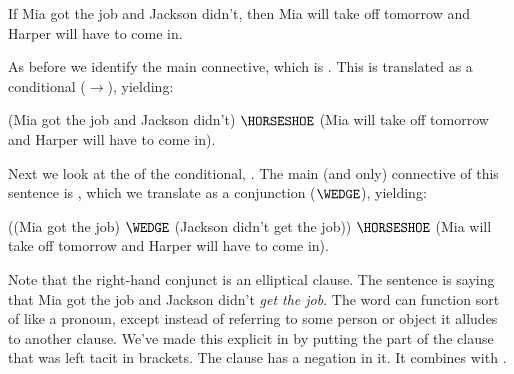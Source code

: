 \begin{majorILnc}{}
	\begin{menumerate}
		\item\label{GSLTransSentenceI} If Mia got the job and Jackson didn't, then Mia will take off tomorrow and Harper will have to come in.
	\end{menumerate}
	As before we identify the main connective, which is . 
	This is translated as a conditional ($\rightarrow$), yielding: 
	\begin{menumerate}
		\item\label{GSLTransSentenceJ} (Mia got the job and Jackson didn't) $\HORSESHOE$ (Mia will take off tomorrow and Harper will have to come in).
	\end{menumerate}
	Next we look at the  of the conditional, . 
	The main (and only) connective of this sentence is , which we translate as a conjunction ($\WEDGE$), yielding: 
	\begin{menumerate}
		\item\label{GSLTransSentenceK} ((Mia got the job) $\WEDGE$ (Jackson didn't get the job)) $\HORSESHOE$ (Mia will take off tomorrow and Harper will have to come in).
	\end{menumerate}

	Note that the right-hand conjunct  is an elliptical clause. 
	The sentence is saying that Mia got the job and Jackson didn't \emph{get the job}.  The word  can function sort of like a pronoun, except instead of referring to some person or object it alludes to another clause.
	We've made this explicit in by putting the part of the clause that was left tacit in brackets. 
The clause  has a negation in it. It combines  with . 
	

\end{majorILnc}

